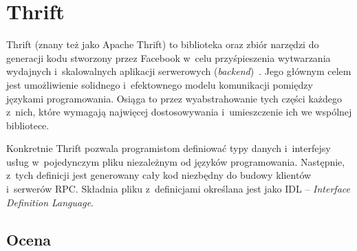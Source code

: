 \section{Thrift}
Thrift (znany też jako Apache Thrift) to biblioteka oraz zbiór narzędzi do generacji kodu stworzony przez Facebook w~celu przyśpieszenia wytwarzania wydajnych i~skalowalnych aplikacji serwerowych (\emph{backend})~\cite{thrift-general}.
Jego głównym celem jest umożliwienie solidnego i~efektownego modelu komunikacji pomiędzy językami programowania.
Osiąga to przez wyabstrahowanie tych części każdego z~nich, które wymagają najwięcej dostosowywania i~umieszczenie ich we wspólnej bibliotece.

Konkretnie Thrift pozwala programistom definiować typy danych i~interfejsy usług w~pojedynczym pliku niezależnym od języków programowania.
Następnie, z~tych definicji jest generowany cały kod niezbędny do budowy klientów i~serwerów RPC.
Składnia pliku z~definicjami określana jest jako IDL -- \emph{Interface Definition Language}.

\subsection{Ocena}

